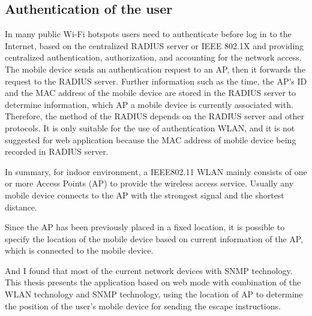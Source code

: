 \subsection{Authentication of the user}

In many public Wi-Fi hotspots users need to authenticate before log in to the Internet, based on the centralized RADIUS server or IEEE 802.1X and providing centralized authentication, authorization, and accounting for the network access\cite{rfc2865}. The mobile device sends an authentication request to an AP, then it forwards the request to the RADIUS server\cite{YenChengChen2003}. Further information such as the time, the AP's ID and the MAC address of the mobile device are stored in the RADIUS server to determine information, which AP a mobile device is currently associated with. Therefore, the method of the RADIUS depends on the RADIUS server and other protocols. It is only suitable for the use of authentication WLAN, and it is not suggested for web application because the MAC address of mobile device being recorded in RADIUS server.        

In summary, for indoor environment, a IEEE802.11 WLAN mainly consists of one or more Access Points (AP) to provide the wireless access service. Usually any mobile device connects to the AP with the strongest signal and the shortest distance.

Since the AP has been previously placed in a fixed location, it is possible to specify the location of the mobile device based on current information of the AP, which is connected to the mobile device. 

And I found that most of the current network devices with SNMP technology. This thesis presents the application based on web mode with combination of the WLAN technology and SNMP technology\cite{TryfonTheodorou2009}, using the location of AP to determine the position of the user's mobile device for sending the escape instructions.

